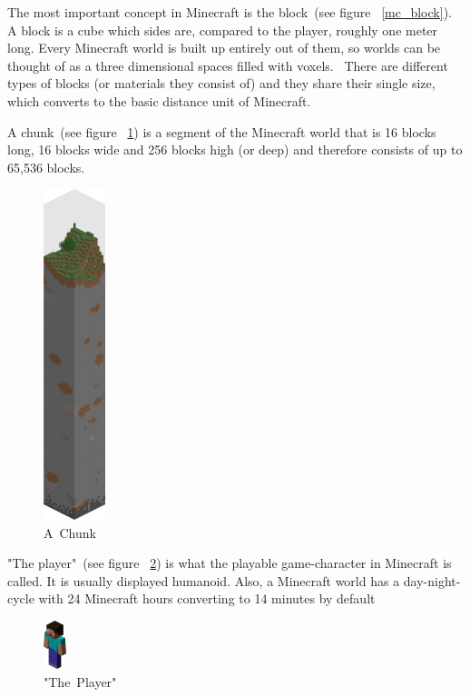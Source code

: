 The most important concept in Minecraft is the block~(see figure ~\ref{mc_block}). A block is a cube which sides are, compared to the player, roughly one meter long. Every Minecraft world is built up entirely out of them, so worlds can be thought of as a three dimensional spaces filled with voxels.~\cite{baloghcodemetropolis} There are different types of blocks (or materials they consist of) and they share their single size, which converts to the basic distance unit of Minecraft.

A chunk~(see figure ~\ref{mc_chunk}) is a segment of the Minecraft world that is 16 blocks long, 16 blocks wide and 256 blocks high (or deep) and therefore consists of up to 65,536 blocks.~\cite{mcwiki_chunks}

\begin{figure}
  \begin{center}
    \includegraphics[width=0.16\textwidth]{graphics/chunk}
  \end{center}
  \caption{A~Chunk~\cite{image_mob}}
  \label{mc_chunk}
\end{figure} 

"The player"~(see figure ~\ref{mc_player}) is what the playable game-character in Minecraft is called. It is usually displayed humanoid.
Also, a Minecraft world has a day-night-cycle with 24 Minecraft hours converting to 14 minutes by default

\begin{figure}
  \begin{center}
    \includegraphics[width=0.06\textwidth]{graphics/player}
  \end{center}
  \caption{"The~Player"~\cite{image_mob}}
  \label{mc_player}
\end{figure} 

